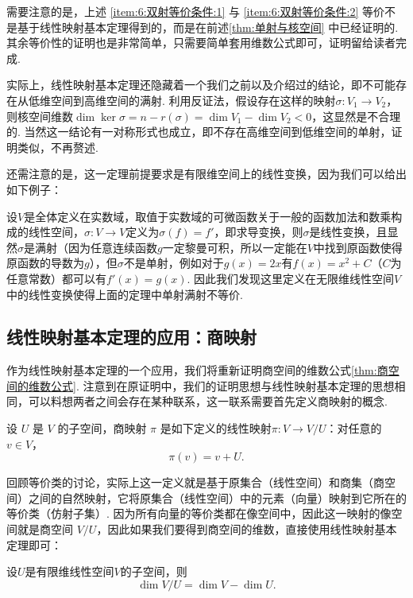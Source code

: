 需要注意的是，上述 \ref*{item:6:双射等价条件:1} 与 \ref*{item:6:双射等价条件:2} 等价不是基于线性映射基本定理得到的，而是在前述\autoref{thm:单射与核空间} 中已经证明的. 其余等价性的证明也是非常简单，只需要简单套用维数公式即可，证明留给读者完成.

实际上，线性映射基本定理还隐藏着一个我们之前以及介绍过的结论，即不可能存在从低维空间到高维空间的满射. 利用反证法，假设存在这样的映射$\sigma:V_1\to V_2$，则核空间维数$\dim\ker\sigma=n-r(\sigma)=\dim V_1-\dim V_2<0$，这显然是不合理的. 当然这一结论有一对称形式也成立，即不存在高维空间到低维空间的单射，证明类似，不再赘述.

还需注意的是，这一定理前提要求是有限维空间上的线性变换，因为我们可以给出如下例子：

\begin{example}{}{}
    设$V$是全体定义在实数域，取值于实数域的可微函数关于一般的函数加法和数乘构成的线性空间，$\sigma:V\to V$定义为$\sigma(f)=f'$，即求导变换，则$\sigma$是线性变换，且显然$\sigma$是满射（因为任意连续函数$g$一定黎曼可积，所以一定能在$V$中找到原函数使得原函数的导数为$g$），但$\sigma$不是单射，例如对于$g(x)=2x$有$f(x)=x^2+C$（$C$为任意常数）都可以有$f'(x)=g(x)$. 因此我们发现这里定义在无限维线性空间$V$中的线性变换使得上面的定理中单射满射不等价.
\end{example}

\subsection{线性映射基本定理的应用：商映射}

作为线性映射基本定理的一个应用，我们将重新证明商空间的维数公式\autoref{thm:商空间的维数公式}. 注意到在原证明中，我们的证明思想与线性映射基本定理的思想相同，可以料想两者之间会存在某种联系，这一联系需要首先定义商映射的概念.

\begin{definition}{}{}
    设 $U$ 是 $V$ 的子空间，商映射 $\pi$ 是如下定义的线性映射$\pi : V \to V/U$：对任意的 $v \in V$，
    \[\pi(v) = v + U.\]
\end{definition}

回顾等价类的讨论，实际上这一定义就是基于原集合（线性空间）和商集（商空间）之间的自然映射，它将原集合（线性空间）中的元素（向量）映射到它所在的等价类（仿射子集）. 因为所有向量的等价类都在像空间中，因此这一映射的像空间就是商空间 $V/U$，因此如果我们要得到商空间的维数，直接使用线性映射基本定理即可：

\begin{theorem}{}{}
    设$U$是有限维线性空间$V$的子空间，则
    \[\dim V/U=\dim V-\dim U.\]
\end{theorem}

